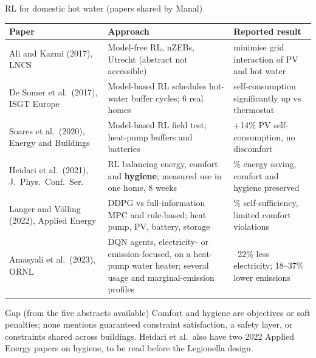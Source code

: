 \documentclass[aspectratio=169,10pt]{beamer}
\begin{document}
\begin{frame}{RL for domestic hot water (papers shared by Manal)}
\scriptsize
\begin{tabularx}{\textwidth}{@{}>{\raggedright\arraybackslash}p{3.4cm}>{\raggedright\arraybackslash}X>{\raggedright\arraybackslash}p{4.1cm}@{}}
\toprule
Paper & Approach & Reported result \\
\midrule
Ali and Kazmi (2017), LNCS & Model-free RL, nZEBs, Utrecht (abstract not accessible) & minimise grid interaction of PV and hot water \\
De Somer et al.\ (2017), ISGT Europe & Model-based RL schedules hot-water buffer cycles; 6 real homes & self-consumption significantly up vs thermostat \\
Soares et al.\ (2020), Energy and Buildings & Model-based RL field test; heat-pump buffers and batteries & +14\% PV self-consumption, no discomfort \\
Heidari et al.\ (2021), J.\ Phys.\ Conf.\ Ser. & RL balancing energy, comfort and \textbf{hygiene}; measured use in one home, 8 weeks & 24.5\% energy saving, comfort and hygiene preserved \\
Langer and V\"olling (2022), Applied Energy & DDPG vs full-information MPC and rule-based; heat pump, PV, battery, storage & 75\% self-sufficiency, limited comfort violations \\
Amasyali et al.\ (2023), ORNL & DQN agents, electricity- or emission-focused, on a heat-pump water heater; several usage and marginal-emission profiles & 12--22\% less electricity; 18--37\% lower emissions \\
\bottomrule
\end{tabularx}
\vspace{0.4em}
\begin{block}{Gap (from the five abstracts available)}
Comfort and hygiene are objectives or soft penalties; none mentions guaranteed constraint satisfaction, a safety layer, or constraints shared across buildings. Heidari et al.\ also have two 2022 Applied Energy papers on hygiene, to be read before the Legionella design.
\end{block}
\end{frame}
\end{document}
